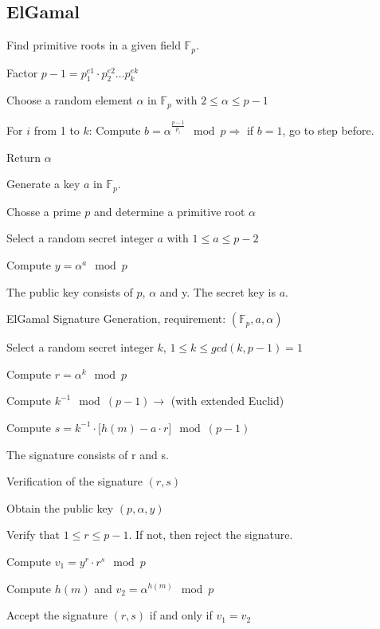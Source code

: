 \subsection{ElGamal}
Find primitive roots in a given field $\mathbb{F}_p$.
\begin{aufzaehlung}
\item Factor $p-1=p_1^{e1} \cdot p_2^{e2} \ldots p_k^{ek}$
\item Choose a random element $\alpha$ in $\mathbb{F}_p$ with $2 \leq \alpha \leq p-1$
\item For $i$ from 1 to $k$:
Compute $b=\alpha ^{\frac{p-1}{p_i}} \mod p \Rightarrow$ if $b=1$, go to step before.
\item Return $\alpha$
\end{aufzaehlung}

Generate a key $a$ in $\mathbb{F}_p$.
\begin{aufzaehlung}
\item Chosse a prime $p$ and determine a primitive root $\alpha$
\item Select a random secret integer $a$ with $1 \leq a \leq p-2$
\item Compute $y=\alpha^a \mod p$
\item The public key consists of $p$, $\alpha$ and y. The secret key is $a$.
\end{aufzaehlung}

ElGamal Signature Generation, requirement: $(\mathbb{F}_p, a, \alpha)$
\begin{aufzaehlung}
  	\item  Select a random secret integer $k$, $1 \leq k \leq gcd(k,p-1)=1$ 
  	\item  Compute $r=\alpha^k \mod p$ 
  	\item  Compute $k^{-1} \mod (p-1) \to$ (with extended Euclid)
  	\item  Compute $s=k^{-1} \cdot \lbrack h(m) - a \cdot r \rbrack \mod (p-1)$
  	\item  The signature consists of r and s.
\end{aufzaehlung}

Verification of the signature $(r,s)$
\begin{aufzaehlung}
  \item   Obtain the public key $(p,\alpha,y)$
  \item   Verify that $1 \leq r \leq p-1$. If not, then reject the signature.
  \item   Compute $v_1=y^r \cdot r^s \mod p$
  \item   Compute $h(m)$ and $v_2=\alpha^{h(m)} \mod p$
  \item   Accept the signature $(r,s)$ if and only if $v_1=v_2$
\end{aufzaehlung}

